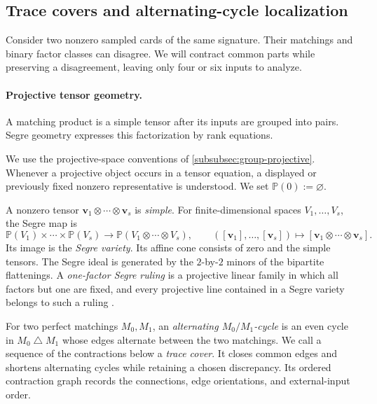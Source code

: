 \documentclass[11pt,letterpaper,onecolumn]{article}
\theoremstyle{plain}
\theoremstyle{definition}
\theoremstyle{remark}
\begin{document}
\subsection{Trace covers and alternating-cycle localization}
\label{proofsubsec:nd-trace-cover}

Consider two nonzero sampled cards of the same signature.  Their matchings and
binary factor classes can disagree.  We will contract common parts while
preserving a disagreement, leaving only four or six inputs to analyze.

\paragraph{Projective tensor geometry.}
\label{subsec:projective-incidence-conventions}

A matching product is a simple tensor after its inputs are grouped into
pairs. Segre geometry expresses this factorization by rank equations.

\label{subsubsec:projective-tensor-geometry}

We use the projective-space conventions of
\cref{subsubsec:group-projective}.  Whenever a projective object occurs in a
tensor equation, a displayed or previously fixed nonzero
representative is understood. We set \(\mathbb P(0):=\varnothing\).

A nonzero tensor \({\mathbf{v}}_1\otimes\cdots\otimes {\mathbf{v}}_s\) is \emph{simple}.  For finite-dimensional spaces \(V_1,\ldots,V_s\), the
Segre map is
\[
 \mathbb P(V_1)\times\cdots\times\mathbb P(V_s)
 \longrightarrow \mathbb P(V_1\otimes\cdots\otimes V_s),
 \qquad ([{\mathbf{v}}_1],\ldots,[{\mathbf{v}}_s])\longmapsto[{\mathbf{v}}_1\otimes\cdots\otimes {\mathbf{v}}_s].
\]
Its image is the \emph{Segre variety}. Its affine cone consists of zero and
the simple tensors.  The Segre ideal is
generated by the \(2\)-by-\(2\) minors of the bipartite flattenings.  A
\emph{one-factor Segre ruling} is a projective linear family in which all
factors but one are fixed, and every projective line contained in a Segre
variety belongs to such a ruling \cite[Chapter~2]{Landsberg2012}.


For two perfect matchings \(M_0,M_1\), an \emph{alternating
\(M_0/M_1\)-cycle} is an even cycle in \(M_0\mathbin\triangle M_1\) whose
edges alternate between the two matchings.  We call a sequence of the
contractions below a \emph{trace cover}. It closes common edges and
shortens alternating cycles while retaining a chosen discrepancy.  Its ordered contraction graph records the connections, edge orientations,
and external-input order.
\end{document}
